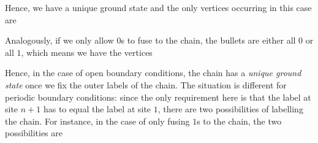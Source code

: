 \noindent
Hence, we have a unique ground state and the only vertices occurring in this case are
	\begin{figure}[H]	
		\hspace{20pt}
	\end{figure}
\noindent
Analogously, if we only allow $0$s to fuse to the chain, the bullets are either all $0$ or all $1$, which means we have the vertices
	\begin{figure}[H]	
		\hspace{20pt}
	\end{figure}
\noindent
Hence, in the case of open boundary conditions, the chain has a \emph{unique ground state} once we fix the outer labels of the chain. The situation is different for periodic boundary conditions: since the only requirement here is that the label at site $n+1$ has to equal the label at site $1$, there are two possibilities of labelling the chain. For instance, in the case of only fusing $1$s to the chain, the two possibilities are
	\begin{figure}[H]
		\hspace{40pt}
	\end{figure}
